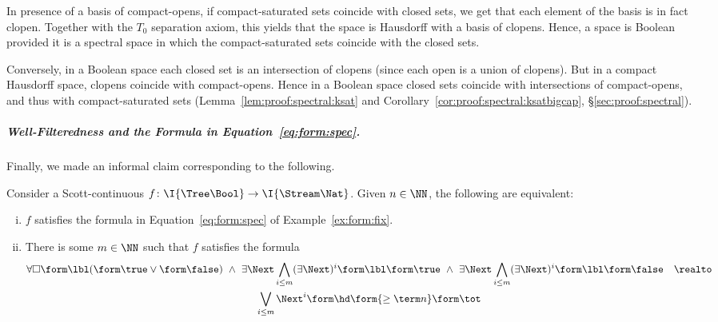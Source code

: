 In presence of a basis of compact-opens,
if compact-saturated sets coincide with closed sets,
we get that each element of the basis is in fact clopen.
Together with the $T_0$ separation axiom, this yields that
the space is Hausdorff with a basis of clopens.
Hence, a space is Boolean provided it is
a spectral space in which the compact-saturated
sets coincide with the closed sets.

Conversely, in a Boolean space each closed set is an
intersection of clopens (since each open is a union of clopens).
But in a compact Hausdorff space, clopens coincide with
compact-opens.
Hence in a Boolean space
closed sets coincide with intersections of compact-opens,
and thus with compact-saturated sets
(Lemma~\ref{lem:proof:spectral:ksat}
and Corollary~\ref{cor:proof:spectral:ksatbigcap},
\S\ref{sec:proof:spectral}).

\subparagraph*{Well-Filteredness and the Formula in Equation~\eqref{eq:form:spec}.}
Finally, we made an informal claim corresponding to the following.

\begin{lemma}
\label{lem:proof:ex:sem:log:fixpoints}
Consider a Scott-continuous
$f \colon \I{\Tree \Bool} \to \I{\Stream \Nat}$.
Given $n \in \NN$, the following are equivalent:
\begin{enumerate}[(i)]
\item
\label{item:proof:ex:sem:log:fixpoints:spec}
$f$ satisfies the formula in Equation~\eqref{eq:form:spec}
of Example~\ref{ex:form:fix}.

\item
\label{item:proof:ex:sem:log:fixpoints:unif}
There is some $m \in \NN$ such that $f$ satisfies the formula
\begin{multline*}
  \forall\Box\form\lbl(\form\true \lor \form\false)
  ~\land~
  \exists\Next \bigwedge_{i \leq m} (\exists\Next)^i \form\lbl\form\true
  ~\land~
  \exists\Next \bigwedge_{i \leq m} (\exists\Next)^i \form\lbl\form\false
  \quad\realto
\\
  \bigvee_{i \leq m}\Next^i \form\hd \form{\geq \term n} \form\tot
\end{multline*}
\end{enumerate}
\end{lemma}

